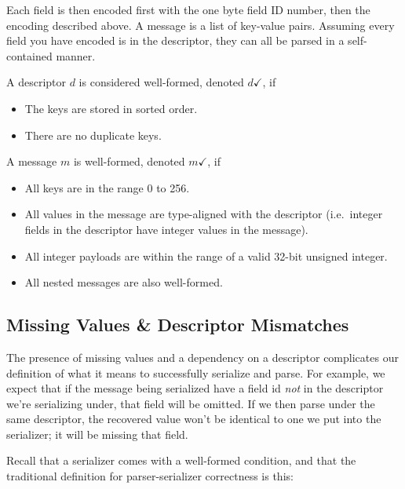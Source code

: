 Each field is then encoded first with the one byte field ID number, then the
encoding described above. A message is a list of key-value pairs. Assuming every
field you have encoded is in the descriptor, they can all be parsed in a
self-contained manner.

\vspace{1em}
\begin{definition}\label{def:inter-dwf}
  A descriptor $d$ is considered well-formed, denoted $d \checkmark$, if
  \begin{itemize}
  \item The keys are stored in sorted order.
  \item There are no duplicate keys.
  \end{itemize}
\end{definition}

\vspace{1em}
\begin{definition}\label{def:inter-vwf}
  A message $m$ is well-formed, denoted $m \checkmark$, if
  \begin{itemize}
  \item All keys are in the range 0 to 256.
  \item All values in the message are type-aligned with the descriptor
    (i.e.\ integer fields in the descriptor have integer values in the message).
  \item All integer payloads are within the range of a valid 32-bit unsigned
    integer.
  \item All nested messages are also well-formed.
  \end{itemize}
\end{definition}

\subsection{Missing Values \& Descriptor Mismatches}\label{sec:ip-missing}
The presence of missing values and a dependency on a descriptor complicates our
definition of what it means to successfully serialize and parse. For example, we
expect that if the message being serialized have a field id \emph{not} in the
descriptor we're serializing under, that field will be omitted. If we then parse
under the same descriptor, the recovered value won't be identical to one we put
into the serializer; it will be missing that field.

Recall that a serializer comes with a well-formed condition, and that the
traditional definition for parser-serializer correctness is this:

